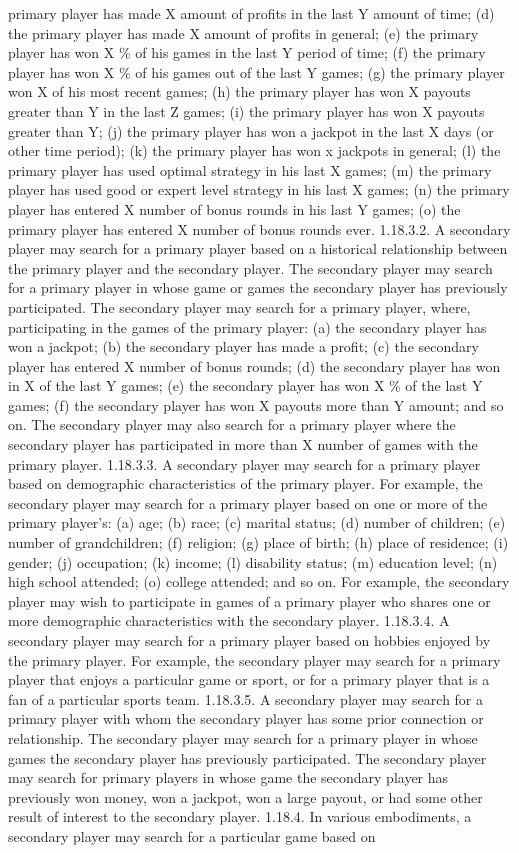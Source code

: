 \documentclass[11pt,a4paper]{article}
\begin{document}
primary player has made X amount of profits in the last Y amount of time; (d) the primary player has made X amount of profits in general; (e) the primary player has won X \% of his games in the last Y period of time; (f) the primary player has won X \% of his games out of the last Y games; (g) the primary player won X of his most recent games; (h) the primary player has won X payouts greater than Y in the last Z games; (i) the primary player has won X payouts greater than Y; (j) the primary player has won a jackpot in the last X days (or other time period); (k) the primary player has won x jackpots in general; (l) the primary player has used optimal strategy in his last X games; (m) the primary player has used good or expert level strategy in his last X games; (n) the primary player has entered X number of bonus rounds in his last Y games; (o) the primary player has entered X number of bonus rounds ever. 1.18.3.2. A secondary player may search for a primary player based on a historical relationship between the primary player and the secondary player. The secondary player may search for a primary player in whose game or games the secondary player has previously participated. The secondary player may search for a primary player, where, participating in the games of the primary player: (a) the secondary player has won a jackpot; (b) the secondary player has made a profit; (c) the secondary player has entered X number of bonus rounds; (d) the secondary player has won in X of the last Y games; (e) the secondary player has won X \% of the last Y games; (f) the secondary player has won X payouts more than Y amount; and so on. The secondary player may also search for a primary player where the secondary player has participated in more than X number of games with the primary player. 1.18.3.3. A secondary player may search for a primary player based on demographic characteristics of the primary player. For example, the secondary player may search for a primary player based on one or more of the primary player's: (a) age; (b) race; (c) marital status; (d) number of children; (e) number of grandchildren; (f) religion; (g) place of birth; (h) place of residence; (i) gender; (j) occupation; (k) income; (l) disability status; (m) education level; (n) high school attended; (o) college attended; and so on. For example, the secondary player may wish to participate in games of a primary player who shares one or more demographic characteristics with the secondary player. 1.18.3.4. A secondary player may search for a primary player based on hobbies enjoyed by the primary player. For example, the secondary player may search for a primary player that enjoys a particular game or sport, or for a primary player that is a fan of a particular sports team. 1.18.3.5. A secondary player may search for a primary player with whom the secondary player has some prior connection or relationship. The secondary player may search for a primary player in whose games the secondary player has previously participated. The secondary player may search for primary players in whose game the secondary player has previously won money, won a jackpot, won a large payout, or had some other result of interest to the secondary player. 1.18.4. In various embodiments, a secondary player may search for a particular game based on 
\end{document}

